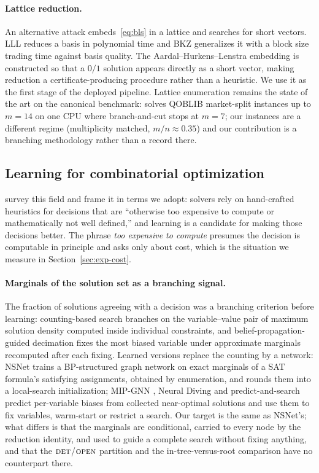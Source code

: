 \documentclass[final,5p,times,twocolumn]{elsarticle}
\newcommand{\FORCED}{\textsc{det}}
\newcommand{\FREE}{\textsc{open}}
\begin{document}
\paragraph{Lattice reduction.} An alternative attack embeds~\eqref{eq:bls} in a lattice and searches for short vectors. LLL \citep{lenstra1982factoring} reduces a basis in polynomial time and BKZ \citep{schnorr1994lattice} generalizes it with a block size trading time against basis quality. The Aardal--Hurkens--Lenstra embedding \citep{aardal2000diophantine, aardal2000market} is constructed so that a $0/1$ solution appears directly as a short vector, making reduction a certificate-producing procedure rather than a heuristic. We use it as the first stage of the deployed pipeline. Lattice enumeration remains the state of the art on the canonical benchmark: \citet{wassermann2025solving} solves QOBLIB market-split instances up to $m=14$ on one CPU where branch-and-cut stops at $m=7$; our instances are a different regime (multiplicity matched, $m/n\approx0.35$) and our contribution is a branching methodology rather than a record there.

\subsection{Learning for combinatorial optimization}

\citet{bengio2021machine} survey this field and frame it in terms we adopt: solvers rely on hand-crafted heuristics for decisions that are ``otherwise too expensive to compute or mathematically not well defined,'' and learning is a candidate for making those decisions better. The phrase \emph{too expensive to compute} presumes the decision is computable in principle and asks only about cost, which is the situation we measure in Section~\ref{sec:exp-cost}.

\paragraph{Marginals of the solution set as a branching signal.} The fraction of solutions agreeing with a decision was a branching criterion before learning: counting-based search \citep{pesant2012counting} branches on the variable--value pair of maximum solution density computed inside individual constraints, and belief-propagation-guided decimation \citep{montanari2007solving} fixes the most biased variable under approximate marginals recomputed after each fixing. Learned versions replace the counting by a network: NSNet \citep{li2022nsnet} trains a BP-structured graph network on exact marginals of a SAT formula's satisfying assignments, obtained by enumeration, and rounds them into a local-search initialization; MIP-GNN \citep{khalil2022mipgnn}, Neural Diving \citep{nair2020solving} and predict-and-search \citep{han2023gnn} predict per-variable biases from collected near-optimal solutions and use them to fix variables, warm-start or restrict a search. Our target is the same as NSNet's; what differs is that the marginals are conditional, carried to every node by the reduction identity, and used to guide a complete search without fixing anything, and that the $\FORCED$/$\FREE$ partition and the in-tree-versus-root comparison have no counterpart there.
\end{document}
